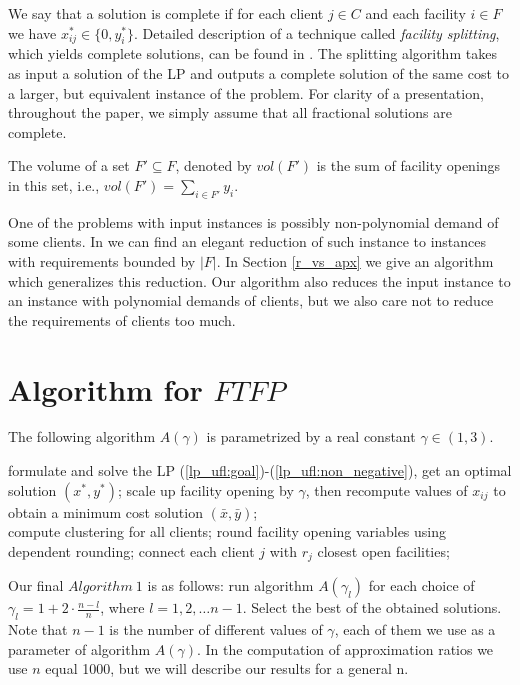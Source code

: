 \documentclass{llncs}
\begin{document}
We say that a solution is complete if for each client $j \in C$ and each facility $i \in F$ we have $x_{ij}^* \in \{0, y_i^*\}$. Detailed description of a technique called \textit{facility splitting}, which yields complete solutions, can be found in \cite{Sviridenko}. The splitting algorithm takes as input a solution of the LP and outputs a complete solution of the same cost to a larger, but equivalent instance of the problem. For clarity of a presentation, throughout the paper, we simply assume that all fractional solutions are complete.

\begin{definition}
 The volume of a set $F' \subseteq F$, denoted by $vol(F')$ is the sum of facility openings in this set, i.e., $vol(F') = \sum_{i \in F'} y_i$.
\end{definition}

One of the problems with input instances is possibly non-polynomial demand of some clients. In \cite{Yan} we can find an elegant reduction of such instance to instances with requirements bounded by $|F|$. In Section \ref{r_vs_apx} we give an algorithm which generalizes this reduction. Our algorithm also reduces the input instance to an instance with polynomial demands of clients, but we also care not to reduce the requirements of clients too much.

\section{Algorithm for $FTFP$}
The following algorithm $A(\gamma)$ is parametrized by a real constant $\gamma \in (1,3)$.
\begin{algorithm}
  \caption{$A(\gamma)$}
\begin{algorithmic}[1]
 \STATE formulate and solve the LP (\ref{lp_ufl:goal})-(\ref{lp_ufl:non_negative}), get an optimal solution $(x^*, y^*)$;
 \STATE scale up facility opening by $\gamma$, then recompute values of $x_{ij}$ to obtain a minimum cost solution $(\bar{x}, \bar{y})$;\\
 \STATE compute clustering for all clients;
 \STATE round facility opening variables using dependent rounding;
 \STATE connect each client $j$ with $r_j$ closest open facilities;
\end{algorithmic}
\end{algorithm}
Our final $Algorithm~1$ is as follows: run algorithm $A(\gamma_l)$ for each choice of $\gamma_l = 1 + 2 \cdot \frac{n - l}{n}$, where $l = 1, 2, \dots n-1$. Select the best of the obtained solutions. Note that $n-1$ is the number of different values of $\gamma$, each of them we use as a parameter of algorithm $A(\gamma)$. In the computation of approximation ratios we use $n$ equal 1000, but we will describe our results for a general n.
\end{document}
